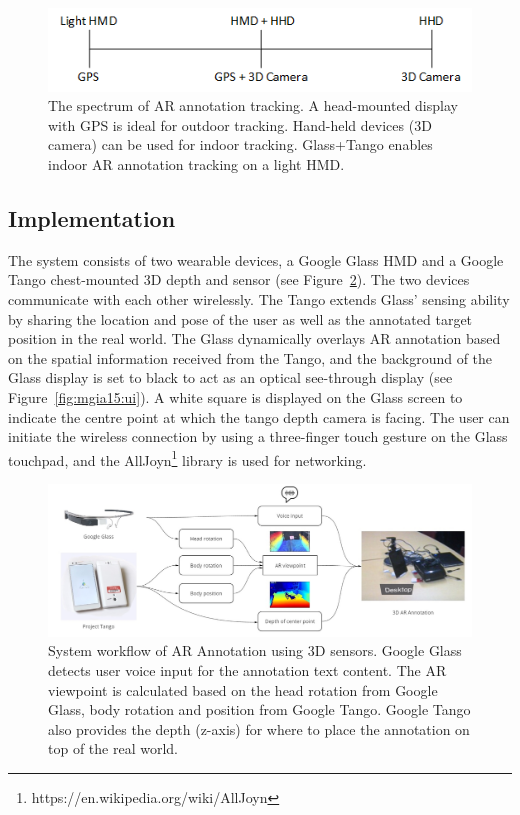 \begin{figure}[ht]
  \centering
  \includegraphics[width=0.8\linewidth]{images/62-3d-mgia15/tango_paper_continuum.png}
  \caption{The spectrum of AR annotation tracking. A head-mounted display with GPS is ideal for outdoor tracking. Hand-held devices (3D camera) can be used for indoor tracking. Glass+Tango enables indoor AR annotation tracking on a light HMD.}
  \label{fig:mgia15:spectrum}
\end{figure}

\subsection{Implementation}

The system consists of two wearable devices, a Google Glass HMD and a Google Tango chest-mounted 3D depth and sensor (see Figure~\ref{fig:mgia15:framework}). The two devices communicate with each other wirelessly. The Tango extends Glass' sensing ability by sharing the location and pose of the user as well as the annotated target position in the real world. The Glass dynamically overlays AR annotation based on the spatial information received from the Tango, and the background of the Glass display is set to black to act as an optical see-through display (see Figure~\ref{fig:mgia15:ui}). A white square is displayed on the Glass screen to indicate the centre point at which the tango depth camera is facing. The user can initiate the wireless connection by using a three-finger touch gesture on the Glass touchpad, and the AllJoyn\footnote{https://en.wikipedia.org/wiki/AllJoyn} library is used for networking.

\begin{figure}[h]
  \centering
  \includegraphics[width=\linewidth]{images/62-3d-mgia15/mgia2015-system.jpg}
  \caption{System workflow of AR Annotation using 3D sensors. Google Glass detects user voice input for the annotation text content. The AR viewpoint is calculated based on the head rotation from Google Glass, body rotation and position from Google Tango. Google Tango also provides the depth (z-axis) for where to place the annotation on top of the real world.}
  \label{fig:mgia15:framework}
\end{figure}

